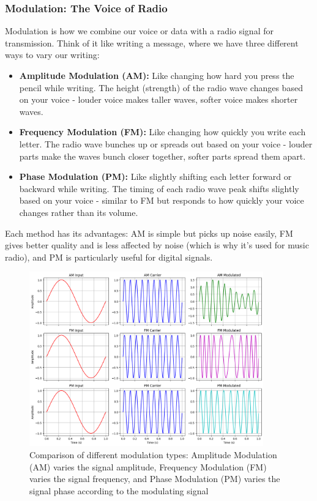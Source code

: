 \subsubsection*{Modulation: The Voice of Radio}
Modulation is how we combine our voice or data with a radio signal for transmission. Think of it like writing a message, where we have three different ways to vary our writing:

\begin{itemize}[noitemsep]
    \item \textbf{Amplitude Modulation (AM):} Like changing how hard you press the pencil while writing. The height (strength) of the radio wave changes based on your voice - louder voice makes taller waves, softer voice makes shorter waves.
    
    \item \textbf{Frequency Modulation (FM):} Like changing how quickly you write each letter. The radio wave bunches up or spreads out based on your voice - louder parts make the waves bunch closer together, softer parts spread them apart.
    
    \item \textbf{Phase Modulation (PM):} Like slightly shifting each letter forward or backward while writing. The timing of each radio wave peak shifts slightly based on your voice - similar to FM but responds to how quickly your voice changes rather than its volume.
\end{itemize}

Each method has its advantages: AM is simple but picks up noise easily, FM gives better quality and is less affected by noise (which is why it's used for music radio), and PM is particularly useful for digital signals.

\begin{figure}[h!]
    \centering
    \includegraphics[width=0.9\textwidth]{tech/images/modulations.png}
    \caption{Comparison of different modulation types: Amplitude Modulation (AM) varies the signal amplitude,  Frequency Modulation (FM) varies the signal frequency, and  Phase Modulation (PM) varies the signal phase according to the modulating signal}
    \label{fig:modulation-comparison}
\end{figure}


